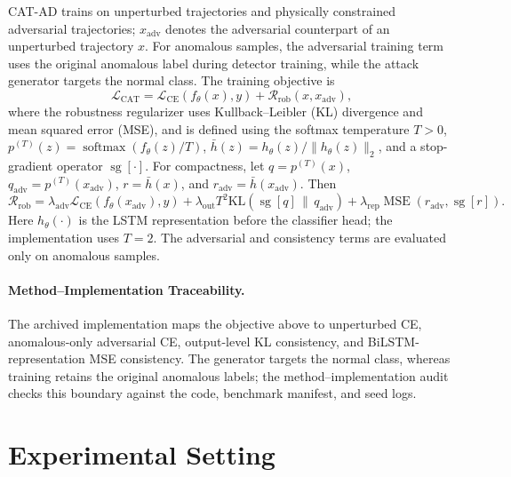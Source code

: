 \documentclass[runningheads]{llncs}
\begin{document}
CAT-AD trains on unperturbed trajectories and physically constrained adversarial trajectories; $x_{\mathrm{adv}}$ denotes the adversarial counterpart of an unperturbed trajectory $x$.
For anomalous samples, the adversarial training term uses the original anomalous label during detector training, while the attack generator targets the normal class.
The training objective is
\begin{equation}
  \mathcal{L}_{\mathrm{CAT}} =
  \mathcal{L}_{\mathrm{CE}}(f_\theta(x), y) + \mathcal{R}_{\mathrm{rob}}(x,x_{\mathrm{adv}}),
\end{equation}
where the robustness regularizer uses Kullback--Leibler (KL) divergence and mean squared error (MSE), and is defined using the softmax temperature $T>0$,
$p^{(T)}(z)=\operatorname{softmax}(f_\theta(z)/T)$,
$\bar h(z)=h_\theta(z)/\|h_\theta(z)\|_2$, and a stop-gradient operator
$\operatorname{sg}[\cdot]$. For compactness, let $q=p^{(T)}(x)$,
$q_{\mathrm{adv}}=p^{(T)}(x_{\mathrm{adv}})$,
$r=\bar h(x)$, and $r_{\mathrm{adv}}=\bar h(x_{\mathrm{adv}})$. Then
\begin{equation}
  \mathcal{R}_{\mathrm{rob}} =
  \lambda_{\mathrm{adv}}\mathcal{L}_{\mathrm{CE}}(f_\theta(x_{\mathrm{adv}}), y)
  + \lambda_{\mathrm{out}}T^2\mathrm{KL}\!\left(\operatorname{sg}[q]\,\|\,q_{\mathrm{adv}}\right)
  + \lambda_{\mathrm{rep}}\operatorname{MSE}\!\left(r_{\mathrm{adv}},\operatorname{sg}[r]\right) .
\end{equation}
Here $h_\theta(\cdot)$ is the LSTM representation before the classifier head; the implementation uses $T=2$.
The adversarial and consistency terms are evaluated only on anomalous samples.

\paragraph{Method--Implementation Traceability.}
The archived implementation maps the objective above to unperturbed CE, anomalous-only adversarial CE, output-level KL consistency, and BiLSTM-representation MSE consistency.
The generator targets the normal class, whereas training retains the original anomalous labels; the method--implementation audit checks this boundary against the code, benchmark manifest, and seed logs.

\section{Experimental Setting}
\label{sec:experimental_setting}
\end{document}
